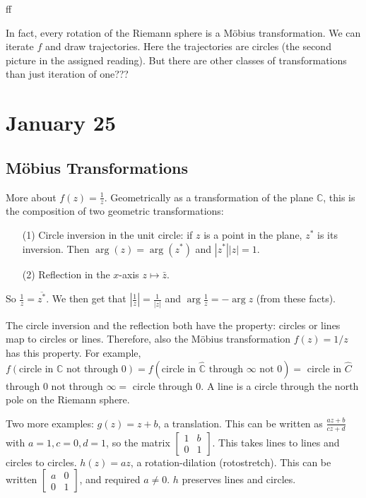 \documentclass{article}
\theoremstyle{plain}
\theoremstyle{remark}
\newcommand{\C}{{\mathbb C}}
\begin{document}
ff

In fact, every rotation of the Riemann sphere is a M\"{o}bius transformation.
We can iterate $f$ and draw trajectories.
Here the trajectories are circles (the second picture in the assigned reading).
But there are other classes of transformations than just iteration of one???


\section{January 25}
\subsection{M\"{o}bius Transformations}
More about $f(z) = \frac{1}{z}$.
Geometrically as a transformation of the plane $\C$,
this is the composition of two geometric transformations:
\begin{enumerate}
	\item[(1)] Circle inversion in the unit circle:
		if $z$ is a point in the plane, $z^*$ is its inversion.
		Then $\arg(z) = \arg(z^*)$ and $|z^*||z| = 1$.
	\item[(2)] Reflection in the $x$-axis $z \mapsto \bar{z}$.
\end{enumerate}
So $\frac{1}{z} = \overline{z^*}$.
We then get that $\left\lvert \frac{1}{z} \right\rvert = \frac{1}{|z|}$
and $\arg\frac{1}{z} = - \arg{z}$ (from these facts).

The circle inversion and the reflection both have the property: circles or lines
map to circles or lines.
Therefore, also the M\"{o}bius transformation $f(z) = 1/z$ has this property.
For example, $f(\text{circle in }\C \text{ not through }0)
= f(\text{circle in }\hat{\C}\text{ through }\infty \text{ not }0) =$
circle in $\hat{C}$ through $0$ not through $\infty = $
circle through $0$.
A line is a circle through the north pole on the Riemann sphere.

Two more examples:
$g(z) = z + b$, a translation.
This can be written as $\frac{az + b}{cz + d}$ with $a =1, c= 0, d = 1$,
so the matrix $\begin{bmatrix} 1 & b \\ 0 & 1 \end{bmatrix}$.
This takes lines to lines and circles to circles.
$h(z) = az$, a rotation-dilation (rotostretch).
This can be written $\begin{bmatrix} a & 0 \\ 0 & 1 \end{bmatrix}$,
and required $a \neq 0$.
$h$ preserves lines and circles.
\end{document}
